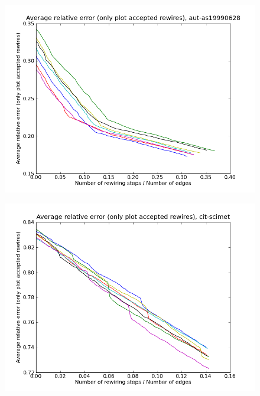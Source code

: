 \documentclass[12pt]{article}
\begin{document}
\begin{figure}[p]
\includegraphics[scale=0.75]{acceptedOnly-aut-as19990628.png}\\
\end{figure}


\begin{figure}[p]
\includegraphics[scale=0.75]{acceptedOnly-cit-scimet.png}\\
\end{figure}
\end{document}
